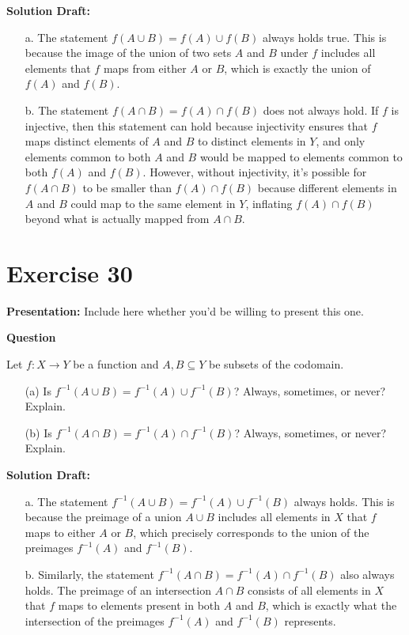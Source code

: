 \documentclass{article}
\begin{document}
\noindent\textbf{Solution Draft:} 

\begin{enumerate}
\item[a.]
The statement \( f(A \cup B) = f(A) \cup f(B) \) always holds true. This is because the image of the union of two sets \( A \) and \( B \) under \( f \) includes all elements that \( f \) maps from either \( A \) or \( B \), which is exactly the union of \( f(A) \) and \( f(B) \).

\item[b.]
The statement \( f(A \cap B) = f(A) \cap f(B) \) does not always hold. If \( f \) is injective, then this statement can hold because injectivity ensures that \( f \) maps distinct elements of \( A \) and \( B \) to distinct elements in \( Y \), and only elements common to both \( A \) and \( B \) would be mapped to elements common to both \( f(A) \) and \( f(B) \). However, without injectivity, it's possible for \( f(A \cap B) \) to be smaller than \( f(A) \cap f(B) \) because different elements in \( A \) and \( B \) could map to the same element in \( Y \), inflating \( f(A) \cap f(B) \) beyond what is actually mapped from \( A \cap B \).
\end{enumerate}

\section*{Exercise 30}  

\noindent\textbf{Presentation:} Include here whether you'd be willing to present this one. 

\vspace{0.5cm} %

\noindent\textbf{Question}

Let \( f : X \to Y \) be a function and \( A, B \subseteq Y \) be subsets of the codomain.
\begin{enumerate}
    \item[(a)] Is \( f^{-1}(A \cup B) = f^{-1}(A) \cup f^{-1}(B) \)? Always, sometimes, or never? Explain.
    \item[(b)] Is \( f^{-1}(A \cap B) = f^{-1}(A) \cap f^{-1}(B) \)? Always, sometimes, or never? Explain.
\end{enumerate}

\noindent\textbf{Solution Draft:} 

\begin{enumerate}
\item[a.]
The statement \( f^{-1}(A \cup B) = f^{-1}(A) \cup f^{-1}(B) \) always holds. This is because the preimage of a union \( A \cup B \) includes all elements in \( X \) that \( f \) maps to either \( A \) or \( B \), which precisely corresponds to the union of the preimages \( f^{-1}(A) \) and \( f^{-1}(B) \).

\item[b.]
Similarly, the statement \( f^{-1}(A \cap B) = f^{-1}(A) \cap f^{-1}(B) \) also always holds. The preimage of an intersection \( A \cap B \) consists of all elements in \( X \) that \( f \) maps to elements present in both \( A \) and \( B \), which is exactly what the intersection of the preimages \( f^{-1}(A) \) and \( f^{-1}(B) \) represents.
\end{enumerate}
\end{document}
